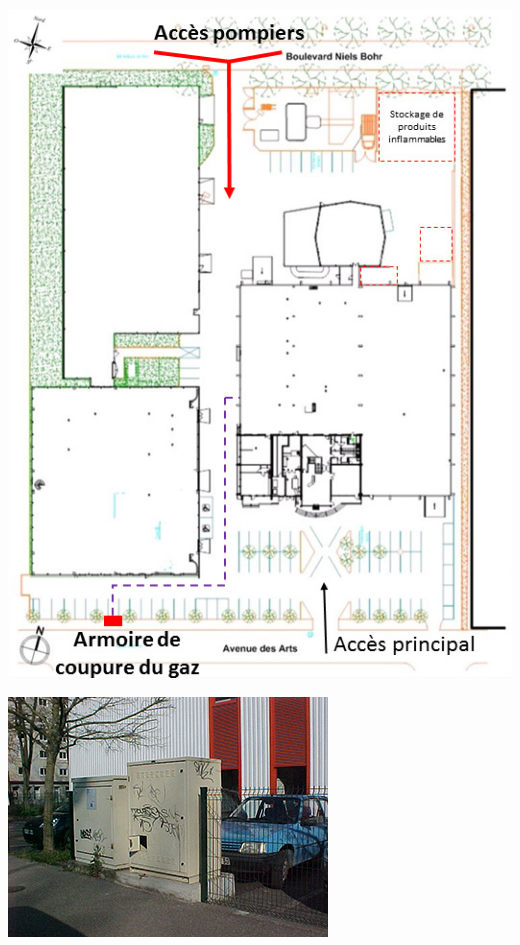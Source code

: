 \documentclass[hidelinks, paper=a4, fontsize=13pt]{report}
\begin{document}
\begin{center}
	\includegraphics[scale=0.8]{Annexes/Plans/planCetiat}
\end{center}

\begin{center}
	\includegraphics[scale=0.8]{Annexes/Images/coupureGazCetiat}
\end{center}
\end{document}

